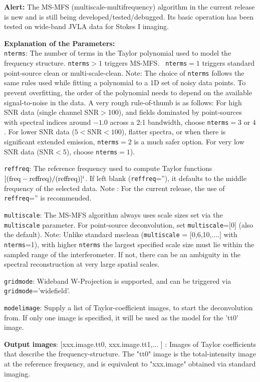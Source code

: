 {\bf Alert:} The MS-MFS (multiscale-multifrequency) algorithm in the
current release is new and is still being
developed/tested/debugged. Its basic operation has been tested on
wide-band JVLA data for Stokes I imaging.

{\bf Explanation of the Parameters:} \\
{\tt nterms}: The number of terms in the Taylor polynomial used to
model the frequency structure.  {\tt nterms}$>1$ triggers MS-MFS. {\tt
  nterms}$=1$ triggers standard point-source clean or
multi-scale-clean.  Note: The choice of {\tt nterms} follows the same
rules used while fitting a polynomial to a 1D set of noisy data
points. To prevent overfitting, the order of the polynomial needs to
depend on the available signal-to-noise in the data.  A very rough
rule-of-thumb is as follows: For high SNR data (single channel
SNR$>$100), and fields dominated by point-sources with spectral
indices around $-1.0$ across a 2:1 bandwidth, choose {\tt nterms}$=3$
or $4$. For lower SNR data ($5<$SNR$<100$), flatter spectra, or when
there is significant extended emission, {\tt nterms}$=2$ is a much
safer option. For very low SNR data (SNR$<5$), choose {\tt nterms}$=1$).



{\tt reffreq}: The reference frequency used to compute Taylor
functions $[ ({\rm freq} - {\rm reffreq})/({\rm reffreq}) ]^{i}$.  If
left blank ({\tt reffreq}=''), it defaults to the middle frequency of
the selected data.  Note : For the current release, the use of {\tt
  reffreq}='' is recommended.



{\tt multiscale}: The MS-MFS algorithm always uses scale sizes set via
the {\tt multiscale} parameter.  For point-source deconvolution, set
{\tt multiscale}=[0] (also the default).  Note: Unlike standard
msclean ({\tt multiscale} = [0,6,10,....] with {\tt nterms}=1), with
higher {\tt nterms} the largest specified scale size must lie within
the sampled range of the interferometer. If not, there can be an
ambiguity in the spectral reconstruction at very large spatial scales.

{\tt gridmode}: Wideband W-Projection is supported, and can be
triggered via {\tt gridmode}='widefield'.


{\tt modelimage}: Supply a list of Taylor-coefficient images, to start the deconvolution from.  
               If only one image is specified, it will be used as the model for the 'tt0' image. 
     

{\bf Output images}: [xxx.image.tt0,
               xxx.image.tt1,... ] : Images of Taylor coefficients
               that describe the frequency-structure.  The "tt0" image
               is the total-intensity image at the reference
               frequency, and is equivalent to "xxx.image" obtained
               via standard imaging.


